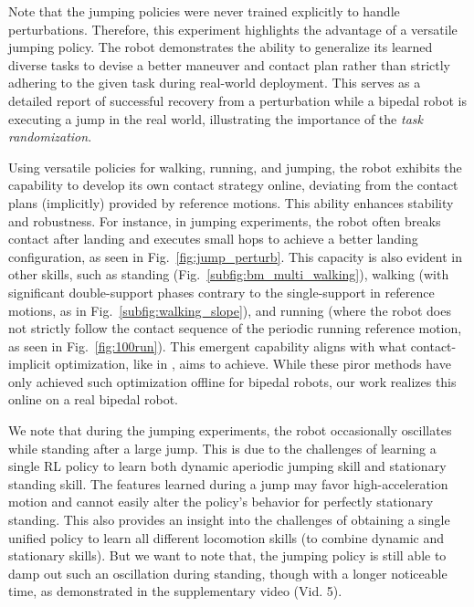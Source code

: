 Note that the jumping policies were never trained explicitly to handle perturbations. 
Therefore, this experiment highlights the advantage of a versatile jumping policy. 
The robot demonstrates the ability to generalize its learned diverse tasks to devise a better maneuver and contact plan rather than strictly adhering to the given task during real-world deployment. 
This serves as a detailed report of successful recovery from a perturbation while a bipedal robot is executing a jump in the real world, illustrating the importance of the \textit{task randomization}.



\begin{remark}
Using versatile policies for walking, running, and jumping, the robot exhibits the capability to develop its own contact strategy online, deviating from the contact plans (implicitly) provided by reference motions. This ability enhances stability and robustness. For instance, in jumping experiments, the robot often breaks contact after landing and executes small hops to achieve a better landing configuration, as seen in Fig.~\ref{fig:jump_perturb}.
This capacity is also evident in other skills, such as standing (Fig.~\ref{subfig:bm_multi_walking}), walking (with significant double-support phases contrary to the single-support in reference motions, as in Fig.~\ref{subfig:walking_slope}), and running (where the robot does not strictly follow the contact sequence of the periodic running reference motion, as seen in Fig.~\ref{fig:100run}).
This emergent capability aligns with what contact-implicit optimization, like in \cite{posa2014direct,drnach2021robust,landry2022bilevel}, aims to achieve. While these piror methods have only achieved such optimization offline for bipedal robots, our work realizes this online on a real bipedal robot.
\end{remark}


\begin{remark}
We note that during the jumping experiments, the robot occasionally oscillates while standing after a large jump. 
This is due to the challenges of learning a single RL policy to learn both dynamic aperiodic jumping skill and stationary standing skill. 
The features learned during a jump may favor high-acceleration motion and cannot easily alter the policy's behavior for perfectly stationary standing. 
This also provides an insight into the challenges of obtaining a single unified policy to learn all different locomotion skills (to combine dynamic and stationary skills). 
But we want to note that, the jumping policy is still able to damp out such an oscillation during standing, though with a longer noticeable time, as demonstrated in the supplementary video (Vid. 5). 
\end{remark}


